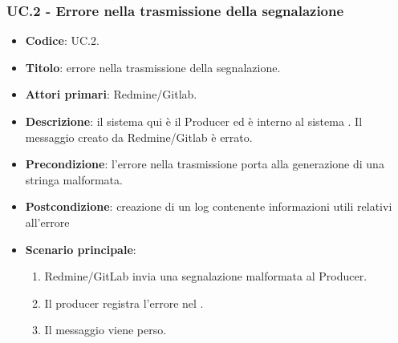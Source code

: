 \subsubsection{UC\theuccount.2 - Errore nella trasmissione della segnalazione}
	\begin{itemize}
		\item \textbf{Codice}: UC\theuccount.2.
		\item \textbf{Titolo}: errore nella trasmissione della segnalazione.
		\item \textbf{Attori primari}: Redmine/Gitlab.
		\item \textbf{Descrizione}: il sistema qui è il Producer ed è interno al sistema \progetto. Il messaggio creato da Redmine/Gitlab è errato.
		\item \textbf{Precondizione}: l'errore nella trasmissione porta alla generazione di una stringa malformata.
		\item \textbf{Postcondizione}: creazione di un log contenente informazioni utili relativi all'errore
		\item \textbf{Scenario principale}:
		\begin{enumerate}
			\item Redmine/GitLab invia una segnalazione malformata al Producer.
			\item Il producer registra l'errore nel .
			\item Il messaggio viene perso.
		\end{enumerate}
	\end{itemize}

